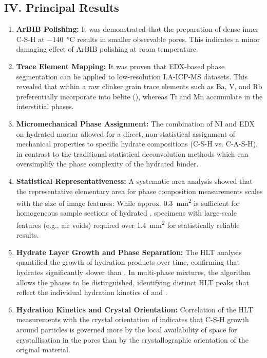 \documentclass[11pt, a4paper]{article}
\begin{document}
\subsection*{IV. Principal Results}

\begin{enumerate}[label=\textbf{\arabic*.}, leftmargin=1.5cm, labelsep=0.5cm, itemsep=0.5em, resume]
    \item \textbf{ArBIB Polishing:} It was demonstrated that the preparation of dense inner C-S-H at \qty{-140}{\celsius} results in smaller observable pores.
    This indicates a minor damaging effect of ArBIB polishing at room temperature.
    \item \textbf{Trace Element Mapping:} It was proven that EDX-based phase segmentation can be applied to low-resolution LA-ICP-MS datasets. This revealed that within a raw clinker grain trace elements such as Ba, V, and Rb preferentially incorporate into belite (), whereas Ti and Mn accumulate in the interstitial phases.
    \item \textbf{Micromechanical Phase Assignment:} The combination of NI and EDX on hydrated mortar allowed for a direct, non-statistical assignment of mechanical properties to specific hydrate compositions (C-S-H vs. C-A-S-H), in contrast to the traditional statistical deconvolution methods which can oversimplify the phase complexity of the hydrated binder.
    \newpage
    \item \textbf{Statistical Representativeness:} A systematic area analysis showed that the representative elementary area for phase composition measurements scales with the size of image features: While approx. \qty{0.3}{\milli\meter\squared} is sufficient for homogeneous sample sections of hydrated , specimens with large-scale features (e.g., air voids) required over \qty{1.4}{\milli\meter\squared} for statistically reliable results.
    \item \textbf{Hydrate Layer Growth and Phase Separation:} The HLT analysis quantified the growth of hydration products over time, confirming that  hydrates significantly slower than .
    In multi-phase mixtures, the algorithm allows the phases to be distinguished, identifying distinct HLT peaks that reflect the individual hydration kinetics of  and .
    \item \textbf{Hydration Kinetics and Crystal Orientation:} Correlation of the HLT measurements with the crystal orientation of  indicates that C-S-H growth around  particles is governed more by the local availability of space for crystallisation in the pores than by the crystallographic orientation of the original  material.

\end{enumerate}
\end{document}
